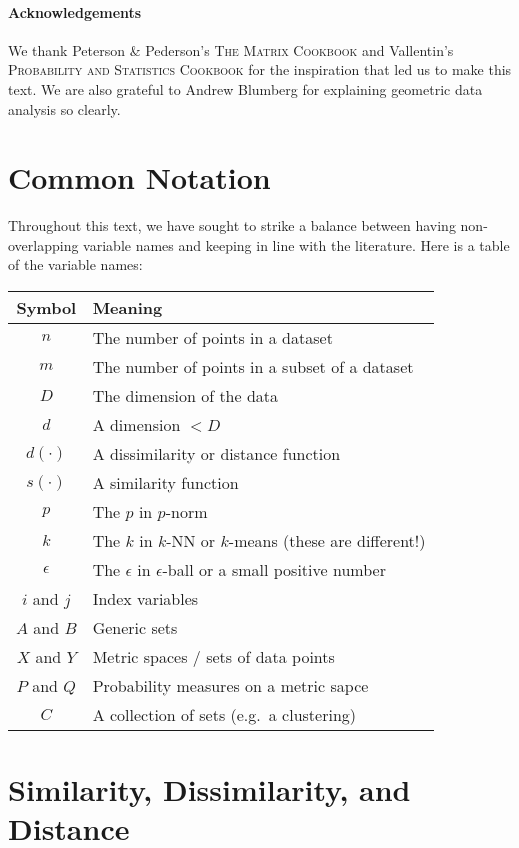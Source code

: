 \documentclass[12pt,a4paper]{article}
\newcommand{\x}{\cdot}
\newcommand{\1}[1]{\mathds{1}\left[#1\right]}
\begin{document}
\paragraph{Acknowledgements} We thank Peterson \& Pederson's \textsc{The Matrix Cookbook} and Vallentin's \textsc{Probability and Statistics Cookbook} for the inspiration that led us to make this text. We are also grateful to Andrew Blumberg for explaining geometric data analysis so clearly.

\section*{Common Notation}
Throughout this text, we have sought to strike a balance between having non-overlapping variable names and keeping in line with the literature. Here is a table of the variable names:

\begin{table}[ht]
\centering
\begin{tabular}{c|l}
Symbol & Meaning\\\hline
$n$ & The number of points in a dataset\\
$m$ & The number of points in a subset of a dataset\\
$D$ & The dimension of the data\\
$d$ & A dimension $<D$\\
$d(\x)$ & A dissimilarity or distance function\\
$s(\x)$ & A similarity function\\
$p$ & The $p$ in $p$-norm\\
$k$ & The $k$ in $k$-NN or $k$-means (these are different!)\\
$\epsilon$ & The $\epsilon$ in $\epsilon$-ball or a small positive number\\
$i$ and $j$ & Index variables\\
$A$ and $B$ & Generic sets\\
$X$ and $Y$ & Metric spaces / sets of data points\\
$P$ and $Q$ & Probability measures on a metric sapce\\
$C$ & A collection of sets (e.g.~a clustering)\\
\end{tabular}
\end{table}


\newpage
\setcounter{tocdepth}{2}
\tableofcontents

\newpage
\section{Similarity, Dissimilarity, and Distance}
\end{document}
